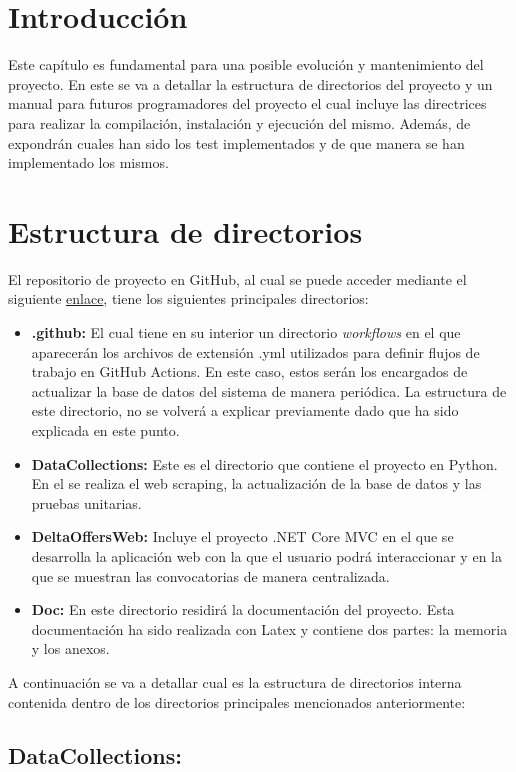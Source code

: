 
\section{Introducción}
Este capítulo es fundamental para una posible evolución y mantenimiento del proyecto. En este se va a detallar la estructura de directorios del proyecto y un manual para futuros programadores del proyecto el cual incluye las directrices para realizar la compilación, instalación y ejecución del mismo. Además, de expondrán cuales han sido los test implementados y de que manera se han implementado los mismos.
\section{Estructura de directorios}
El repositorio de proyecto en GitHub, al cual se puede acceder mediante el siguiente \href{https://github.com/miguelUbierna/DeltaOffers}{enlace}, tiene los siguientes principales directorios:

\begin{itemize}
    \item \textbf{.github:} El cual tiene en su interior un directorio \textit{workflows} en el que aparecerán los archivos de extensión .yml utilizados para definir flujos de trabajo en GitHub Actions. En este caso, estos serán los encargados de actualizar la base de datos del sistema de manera periódica. La estructura de este directorio, no se volverá a explicar previamente dado que ha sido explicada en este punto.
    \item \textbf{DataCollections:} Este es el directorio que contiene el proyecto en Python. En el se realiza el web scraping, la actualización de la base de datos y las pruebas unitarias.
    \item \textbf{DeltaOffersWeb:} Incluye el proyecto .NET Core MVC en el que se desarrolla la aplicación web con la que el usuario podrá interaccionar y en la que se muestran las convocatorias de manera centralizada.
    \item \textbf{Doc:} En este directorio residirá la documentación del proyecto. Esta documentación ha sido realizada con Latex y contiene dos partes: la memoria y los anexos.
\end{itemize}
A continuación se va a detallar cual es la estructura de directorios interna contenida dentro de los directorios principales mencionados anteriormente:

\subsection{DataCollections:}

